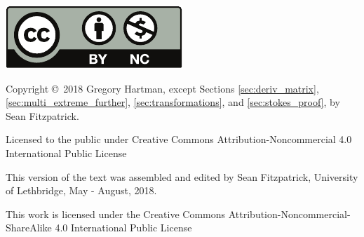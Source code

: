 \noindent\hskip -1in\begin{minipage}{2in}
\includegraphics{text/by-nc} 
\end{minipage}
\begin{minipage}{3in}
\noindent Copyright \copyright\ 2018 Gregory Hartman, except Sections \ref{sec:deriv_matrix}, \ref{sec:multi_extreme_further}, \ref{sec:transformations}, and \ref{sec:stokes_proof}, by Sean Fitzpatrick.

Licensed to the public under Creative Commons Attribution-Noncommercial 4.0 International Public License
\end{minipage}

\bigskip

\bigskip



\bigskip

\begin{minipage}{3.3in}
This version of the text was assembled and edited by Sean Fitzpatrick, University of Lethbridge, May - August, 2018. 

This work is licensed under the Creative Commons Attribution-Noncommercial-ShareAlike 4.0 International Public License
\end{minipage}
